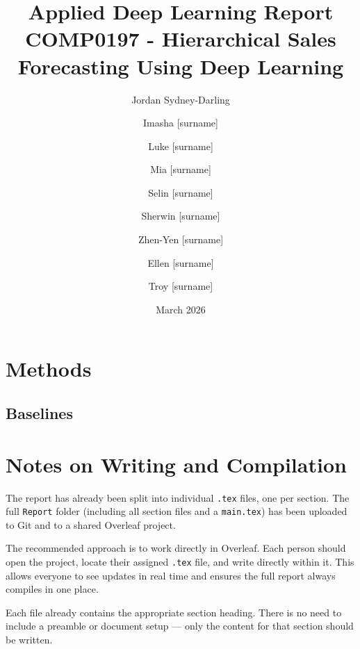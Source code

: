 \documentclass[runningheads,oneside]{llncs}
\title{Applied Deep Learning Report COMP0197 - Hierarchical Sales Forecasting Using Deep Learning}
\author{
Jordan Sydney-Darling \and
Imasha [surname] \and
Luke [surname]\and
Mia [surname]\and
Selin [surname]\and
Sherwin [surname]\and
Zhen-Yen [surname]\and
Ellen [surname]\and
Troy [surname]
}
\institute{
University College London, UK
}
\date{March 2026}
\begin{document}

\maketitle

\begin{abstract}
\end{abstract}





\section{Methods}
\subsection{Baselines}

          
















\newpage
\appendix
\section{Notes on Writing and Compilation}

The report has already been split into individual \texttt{.tex} files, one per section. The full \texttt{Report} folder (including all section files and a \texttt{main.tex}) has been uploaded to Git and to a shared Overleaf project.

The recommended approach is to work directly in Overleaf. Each person should open the project, locate their assigned \texttt{.tex} file, and write directly within it. This allows everyone to see updates in real time and ensures the full report always compiles in one place.

Each file already contains the appropriate section heading. There is no need to include a preamble or document setup — only the content for that section should be written.
\end{document}
